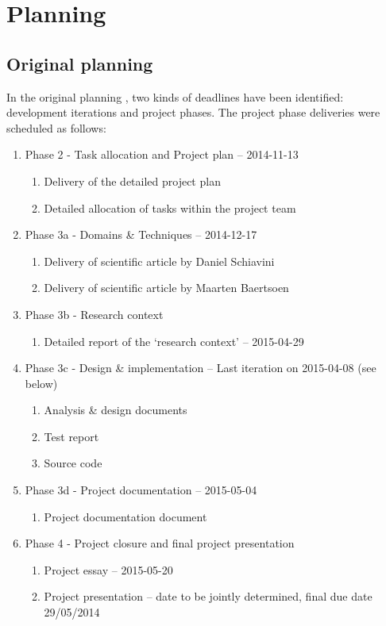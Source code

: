 
\section{Planning}
\subsection{Original planning}
In the original planning , two kinds of deadlines have been identified: development iterations and project phases.
The project phase deliveries were scheduled as follows:
 \begin{enumerate}
	\item Phase 2 - Task allocation and Project plan			-- 	2014-11-13
 	\begin{enumerate}
		\item Delivery of the detailed project plan 			
		\item Detailed allocation of tasks within the project team 
	\end {enumerate}
	\item Phase 3a - Domains \& Techniques					-- 	2014-12-17
 	\begin{enumerate}
		\item Delivery of scientific article by Daniel Schiavini
		\item Delivery of scientific article by Maarten Baertsoen
	\end {enumerate}
 	\item Phase 3b - Research context
 	\begin{enumerate}
		\item Detailed report of the `research context'  		-- 	2015-04-29
	\end {enumerate}
 	\item Phase 3c - Design \& implementation				-- Last iteration on 2015-04-08 (see below)
 	\begin{enumerate}
		\item Analysis \& design documents
		\item Test report
		\item Source code
	\end {enumerate}
 	\item Phase 3d - Project documentation					-- 	2015-05-04
 	\begin{enumerate}
		\item Project documentation document	
	\end {enumerate}
	\item Phase 4 - Project closure and final project presentation
 	\begin{enumerate}
		\item Project essay							-- 	2015-05-20
		\item Project presentation						-- 	date to be jointly determined, final due date 29/05/2014
	\end {enumerate}
\end {enumerate}
